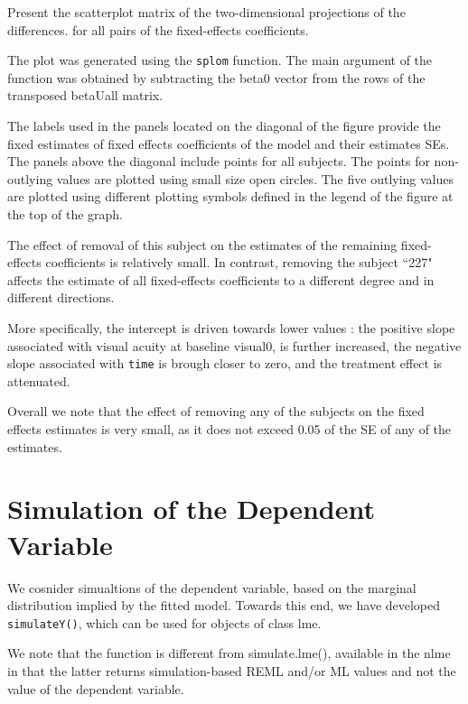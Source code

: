 \documentclass[a4paper,12pt]{article}
\begin{document}
Present the scatterplot matrix of the two-dimensional projections of the differences.
for all pairs of the fixed-effects coefficients.

The plot was generated using the \texttt{splom} function. The main argument of the 
function was obtained by subtracting the beta0 vector from the rows of the transposed
betaUall matrix.

The labels used in the panels located on the diagonal of the figure provide the fixed estimates of fixed effects coefficients
of the model and their estimates SEs.
The panels above the diagonal include points for all subjects.
The points for non-outlying values are plotted using small size open circles.
The five outlying values are plotted using different plotting symbols defined in the
legend of the figure at the top of the graph.


The effect of removal of this subject on the estimates of the remaining fixed-effects coefficients is relatively small.
In contrast, removing the subject ``227" affects the estimate of all fixed-effects coefficients to a different degree and in different directions.

More specifically, the intercept is driven towards lower values : the positive slope associated with visual acuity at baseline visual0, is further increased, the negative slope associated with \texttt{time} is brough closer to zero, and the treatment effect is attenuated.


Overall we note that the effect of removing any of the subjects on the fixed effects estimates is very small, as it does not exceed 0.05 of the SE of any of the  estimates.

\section{Simulation of the Dependent Variable}

We cosnider simualtions of the dependent variable, based on the marginal distribution 
implied by the fitted model.
Towards this end, we have developed \texttt{simulateY()}, which can be used for objects of class lme.

We note that the function is different from simulate.lme(), available in the nlme in that the latter returns
simulation-based REML and/or ML values and not the value of the dependent variable.
\end{document}
